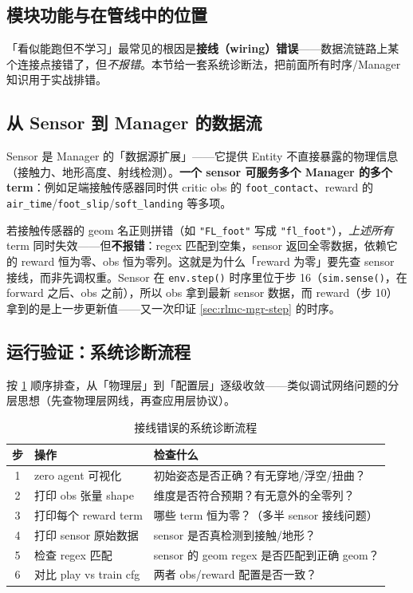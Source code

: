 \subsection{模块功能与在管线中的位置}

「看似能跑但不学习」最常见的根因是\textbf{接线（wiring）错误}——数据流链路上某个连接点接错了，但\emph{不报错}。本节给一套系统诊断法，把前面所有时序/Manager 知识用于实战排错。

\subsection{从 Sensor 到 Manager 的数据流}

Sensor 是 Manager 的「数据源扩展」——它提供 Entity 不直接暴露的物理信息（接触力、地形高度、射线检测）。\textbf{一个 sensor 可服务多个 Manager 的多个 term}：例如足端接触传感器同时供 critic obs 的 \verb|foot_contact|、reward 的 \verb|air_time|/\allowbreak\verb|foot_slip|/\allowbreak\verb|soft_landing| 等多项。

\begin{insight}\label{ins:rlmc-mgr-wiring}
若接触传感器的 geom 名正则拼错（如 \verb|"FL_foot"| 写成 \verb|"fl_foot"|），\emph{上述所有} term 同时失效——但\textbf{不报错}：regex 匹配到空集，sensor 返回全零数据，依赖它的 reward 恒为零、obs 恒为零列。这就是为什么「reward 为零」要先查 sensor 接线，而非先调权重。Sensor 在 \verb|env.step()| 时序里位于步 16（\verb|sim.sense()|，在 forward 之后、obs 之前），所以 obs 拿到最新 sensor 数据，而 reward（步 10）拿到的是上一步更新值——又一次印证 \cref{sec:rlmc-mgr-step} 的时序。
\end{insight}

\subsection{运行验证：系统诊断流程}

按 \cref{tab:rlmc-mgr-diag} 顺序排查，从「物理层」到「配置层」逐级收敛——类似调试网络问题的分层思想（先查物理层网线，再查应用层协议）。

\begin{table}[ht]
\centering
\caption{接线错误的系统诊断流程}
\label{tab:rlmc-mgr-diag}
\small
\begin{tabular}{@{}cll@{}}
\toprule
步 & 操作 & 检查什么 \\
\midrule
1 & zero agent 可视化 & 初始姿态是否正确？有无穿地/浮空/扭曲？ \\
2 & 打印 obs 张量 shape & 维度是否符合预期？有无意外的全零列？ \\
3 & 打印每个 reward term & 哪些 term 恒为零？（多半 sensor 接线问题） \\
4 & 打印 sensor 原始数据 & sensor 是否真检测到接触/地形？ \\
5 & 检查 regex 匹配 & sensor 的 geom regex 是否匹配到正确 geom？ \\
6 & 对比 play vs train cfg & 两者 obs/reward 配置是否一致？ \\
\bottomrule
\end{tabular}
\end{table}


